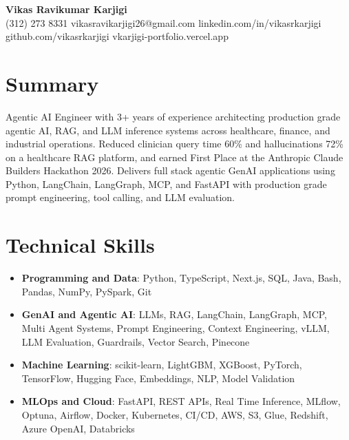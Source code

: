 \documentclass[letterpaper,10pt]{article}
\begin{document}
\begin{center}
  {\Large \textbf{Vikas Ravikumar Karjigi}} \\
  (312) 273 8331 \quad vikasravikarjigi26@gmail.com \quad linkedin.com/in/vikasrkarjigi \quad github.com/vikasrkarjigi \quad vkarjigi-portfolio.vercel.app
\end{center}

\section*{Summary}
Agentic AI Engineer with 3+ years of experience architecting production grade agentic AI, RAG, and LLM inference systems across healthcare, finance, and industrial operations. Reduced clinician query time 60\% and hallucinations 72\% on a healthcare RAG platform, and earned First Place at the Anthropic Claude Builders Hackathon 2026. Delivers full stack agentic GenAI applications using Python, LangChain, LangGraph, MCP, and FastAPI with production grade prompt engineering, tool calling, and LLM evaluation.

\section*{Technical Skills}
\begin{itemize}[leftmargin=0.15in, label={}]
  \item \textbf{Programming and Data}{: Python, TypeScript, Next.js, SQL, Java, Bash, Pandas, NumPy, PySpark, Git}
  \item \textbf{GenAI and Agentic AI}{: LLMs, RAG, LangChain, LangGraph, MCP, Multi Agent Systems, Prompt Engineering, Context Engineering, vLLM, LLM Evaluation, Guardrails, Vector Search, Pinecone} %
  \item \textbf{Machine Learning}{: scikit-learn, LightGBM, XGBoost, PyTorch, TensorFlow, Hugging Face, Embeddings, NLP, Model Validation}
  \item \textbf{MLOps and Cloud}{: FastAPI, REST APIs, Real Time Inference, MLflow, Optuna, Airflow, Docker, Kubernetes, CI/CD, AWS, S3, Glue, Redshift, Azure OpenAI, Databricks}
\end{itemize}
\end{document}
